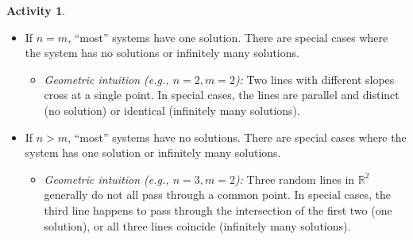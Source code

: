 \documentclass{article}
\theoremstyle{definition}
\newtheorem{activity}{Activity}
\newcounter{calloutbox}
\begin{document}
\begin{activity}
\begin{calloutbox}
\begin{itemize}
\begin{itemize}
    \end{itemize}
    \item If \(n=m\), ``most'' systems have one solution. There are special cases where the system has no solutions or infinitely many solutions.
    \begin{itemize}
        \item \emph{Geometric intuition (e.g., \(n=2, m=2\)):} Two lines with different slopes cross at a single point. In special cases, the lines are parallel and distinct (no solution) or identical (infinitely many solutions).
    \end{itemize}
    \item If \(n>m\), ``most'' systems have no solutions. There are special cases where the system has one solution or infinitely many solutions.
    \begin{itemize}
        \item \emph{Geometric intuition (e.g., \(n=3, m=2\)):} Three random lines in \(\mathbb{R}^2\) generally do not all pass through a common point. In special cases, the third line happens to pass through the intersection of the first two (one solution), or all three lines coincide (infinitely many solutions).
    \end{itemize}
\end{itemize}
\end{calloutbox}
\end{activity}
\end{document}
